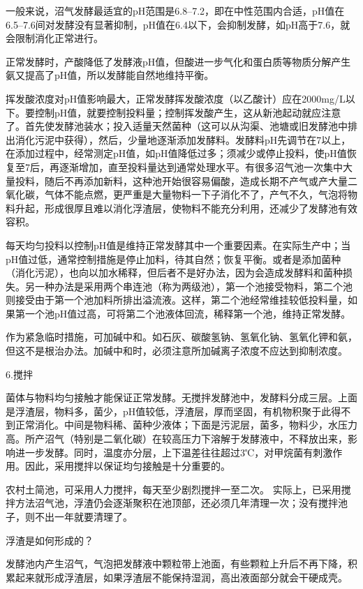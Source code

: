 \documentclass{ctexbook}
\begin{document}
一般来说，沼气发酵最适宜的pH范围是6.8--7.2，即在中性范围内合适，pH值在6.5--7.6间对发酵没有显著抑制，pH值在6.4以下，会抑制发酵，如pH高于7.6，就会限制消化正常进行。

正常发酵时，产酸降低了发酵液pH值，但酸进一步气化和蛋白质等物质分解产生氨又提高了pH值，所以发酵能自然地维持平衡。

挥发酸浓度对pH值影响最大，正常发酵挥发酸浓度（以乙酸计）应在2000mg/L以下。要控制pH值，就要控制投料量；控制挥发酸产生，这从新池起动就应注意了。首先使发酵池装水；投入适量天然菌种（这可以从沟渠、池塘或旧发酵池中排出消化污泥中获得），然后，少量地逐渐添加发酵料。发酵料pH先调节在7以上，在添加过程中，经常测定pH值，如pH值降低过多；须减少或停止投料，使pH值恢复至7后，再逐渐增加，直至投料量达到通常处理水平。有很多沼气池一次集中大量投料，随后不再添加新料，这种池开始很容易偏酸，造成长期不产气或产大量二氧化碳，气体不能点燃，更严重是大量物料一下子消化不了，产气不久，气泡将物料升起，形成很厚且难以消化浮渣层，使物料不能充分利用，还减少了发酵池有效容积。

每天均匀投料以控制pH值是维持正常发酵其中一个重要因素。在实际生产中；当pH值过低，通常控制措施是停止加料，待其自然；恢复平衡。或者是添加菌种（消化污泥），也向以加水稀释，但后者不是好办法，因为会造成发酵料和菌种损失。另一种办法是采用两个串连池（称为两级池），第一个池接受物料，第二个池则接受由于第一个池加料所排出溢流液。这样，第二个池经常维挂较低投料量，如果第一个池pH值过高，可将第二个池液体回流，稀释第一个池，维持正常发酵。

作为紧急临时措施，可加碱中和。如石灰、碳酸氢钠、氢氧化钠、氢氧化钾和氨，但这不是根治办法。加碱中和时，必须注意所加碱离子浓度不应达到抑制浓度。

6.搅拌

菌体与物料均匀接触才能保证正常发酵。无搅拌发酵池中，发酵料分成三层。上面是浮渣层，物料多，菌少，pH值较低，浮渣层，厚而坚固，有机物积聚于此得不到正常消化。中间是物料稀、菌种少液体；下面是污泥层，菌多，物料少，水压力高。所产沼气（特别是二氧化碳）在较高压力下溶解于发酵液中，不释放出来，影响进一步发酵。同时，温度亦分层，上下温差往往超过3℃，对甲烷菌有刺激作用。因此，采用搅拌以保证均匀接触是十分重要的。

农村土简池，可采用人力搅拌，每天至少剧烈搅拌一至二次。
实际上，已采用搅拌方法沼气池，浮渣仍会逐渐聚积在池顶部，还必须几年清理一次；没有搅拌池子，则不出一年就要清理了。

浮渣是如何形成的？

发酵池内产生沼气，气泡把发酵液中颗粒带上池面，有些颗粒上升后不再下降，积累起来就形成浮渣层，如果浮渣层不能保持湿润，高出液面部分就会干硬成壳。
\end{document}
